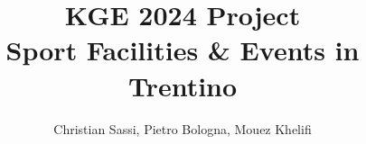 \documentclass{knowdive}
\title{KGE 2024 Project\\\vspace{0.2cm}Sport Facilities \& Events in Trentino}
\author{Christian Sassi, Pietro Bologna, Mouez Khelifi}
\begin{document}
\maketitle
\begin{sloppypar}

\large
\begin{spacing}{1.05}






%
%
%
%

\end{spacing}
\end{sloppypar}
\end{document}
